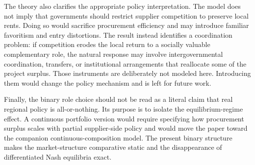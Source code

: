 The theory also clarifies the appropriate policy interpretation. The model does not imply that governments should restrict supplier competition to preserve local rents. Doing so would sacrifice procurement efficiency and may introduce familiar favoritism and entry distortions. The result instead identifies a coordination problem: if competition erodes the local return to a socially valuable complementary role, the natural response may involve intergovernmental coordination, transfers, or institutional arrangements that reallocate some of the project surplus. Those instruments are deliberately not modeled here. Introducing them would change the policy mechanism and is left for future work.

Finally, the binary role choice should not be read as a literal claim that real regional policy is all-or-nothing. Its purpose is to isolate the equilibrium-regime effect. A continuous portfolio version would require specifying how procurement surplus scales with partial supplier-side policy and would move the paper toward the companion continuous-composition model. The present binary structure makes the market-structure comparative static and the disappearance of differentiated Nash equilibria exact.
